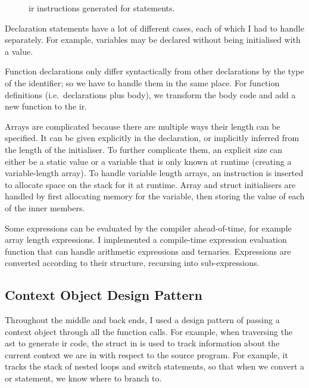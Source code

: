 \documentclass[00-main.tex]{subfiles}
\begin{document}
\begin{figure}[ht]
  \centering
  \caption{\gls{ir} instructions generated for  statements.}
  \label{fig:instr structure for switch statements}
\end{figure}

Declaration statements have a lot of different cases, each of which I had to handle separately.
For example, variables may be declared without being initialised with a value.

Function declarations only differ syntactically from other declarations by the type of the identifier; so we have to handle them in the same place.
For function definitions (i.e.\ declarations plus body), we transform the body code and add a new function to the \gls{ir}.

Arrays are complicated because there are multiple ways their length can be specified.
It can be given explicitly in the declaration, or implicitly inferred from the length of the initialiser.
To further complicate them, an explicit size can either be a static value or a variable that is only known at runtime (creating a variable-length array).
To handle variable length arrays, an instruction is inserted to allocate space on the stack for it at runtime.
Array and struct initialisers are handled by first allocating memory for the variable, then storing the value of each of the inner members.


Some expressions can be evaluated by the compiler ahead-of-time, for example array length expressions.
I implemented a compile-time expression evaluation function that can handle arithmetic expressions and ternaries.
Expressions are converted according to their structure, recursing into sub-expressions.


\subsection{Context Object Design Pattern}
\label{sec:impl:context object design pattern}

Throughout the middle and back ends, I used a design pattern of passing a context object through all the function calls.
For example, when traversing the \gls{ast} to generate \gls{ir} code, the  struct in  is used to track information about the current context we are in with respect to the source program.
For example, it tracks the stack of nested loops and switch statements, so that when we convert a  or  statement, we know where to branch to.
\end{document}
